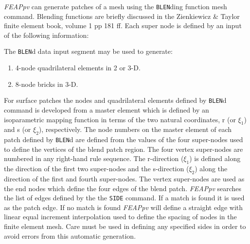 \\{\smallskip}
\\{\smallskip}
 \\{\smallskip}
 \\{\smallskip}
\\{\smallskip}
\headb

{\sl FEAPpv} can generate patches of a mesh using the {\tt BLEN}ding
function mesh command.  Blending functions are briefly discussed in the
Zienkiewicz \& Taylor finite element book, volume 1 pp 181 ff.  Each
super node is defined by an input of the following information:

The {\tt BLEN}d data input segment may be used to generate:
\begin{enumerate}
\item 4-node quadrilateral elements in 2 or 3-D.
\item 8-node bricks in 3-D.
\end{enumerate}

For surface patches
the nodes and quadrilateral elements
defined by {\tt BLEN}d command is developed from a master
element which is defined by an isoparametric
mapping function in terms of the two natural coordinates,
r (or $\xi_1$) and s (or $\xi_2$), respectively.
The node numbers on the master element of each
patch defined by {\tt BLEN}d are defined from the values of the
four super-nodes used to define the vertices of the blend patch region.
The four vertex super-nodes are numbered in any right-hand rule sequence.
The r-direction ($\xi_1$) is defined along the direction of the first
two super-nodes and the s-direction ($\xi_2$) along the direction of the
first and fourth super-nodes.
The vertex super-nodes are used as the end nodes which define the four edges
of the blend patch. {\sl FEAPpv} searches the list of edges defined by the
the {\tt SIDE} command.  If a match is found it is used as the patch edge.
If no match is found {\sl FEAPpv} will define a straight edge with linear
equal increment interpolation used to define the spacing of
nodes in the finite element mesh.  Care must be used in defining any
specified sides in order to avoid errors from this automatic generation.

